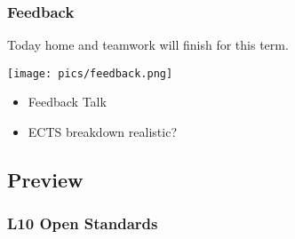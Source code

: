 \begin{frame}
	\frametitle{Feedback}
	Today home and teamwork will finish for this term.

	\hfill \texttt{[image: pics/feedback.png]}
	\vspace{-1cm}
	\begin{itemize}
		\item Feedback Talk
		\item ECTS breakdown realistic?
	\end{itemize}
\end{frame}

\subsection{Preview}

\begin{frame}
	\frametitle{L10 Open Standards}
\end{frame}

\appendix

\begin{frame}[allowframebreaks]
	
	
\end{frame}



